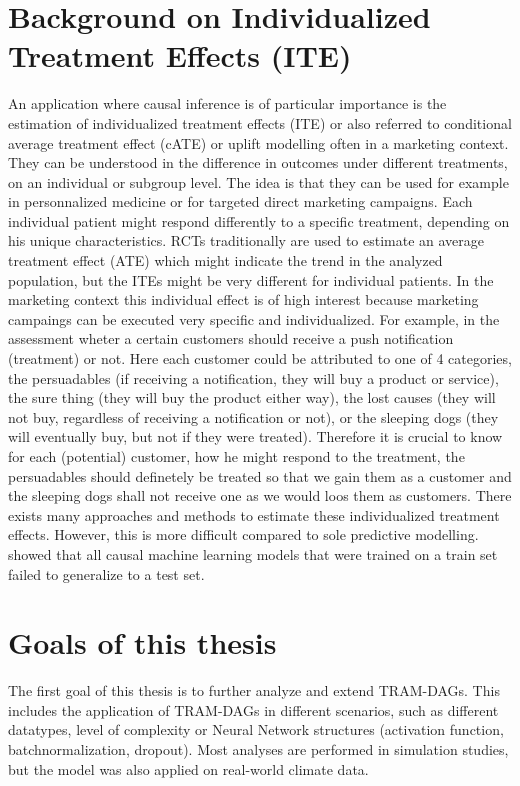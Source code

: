 \section{Background on Individualized Treatment Effects (ITE)}

An application where causal inference is of particular importance is the estimation of individualized treatment effects (ITE) or also referred to conditional average treatment effect (cATE) or uplift modelling often in a marketing context. They can be understood in the difference in outcomes under different treatments, on an individual or subgroup level. The idea is that they can be used for example in personnalized medicine or for targeted direct marketing campaigns. Each individual patient might respond differently to a specific treatment, depending on his unique characteristics. RCTs traditionally are used to estimate an average treatment effect (ATE) which might indicate the trend in the analyzed population, but the ITEs might be very different for individual patients. In the marketing context this individual effect is of high interest because marketing campaings can be executed very specific and individualized. For example, in the assessment wheter a certain customers should receive a push notification (treatment) or not. Here each customer could be attributed to one of 4 categories, the persuadables (if receiving a notification, they will buy a product or service), the sure thing (they will buy the product either way), the lost causes (they will not buy, regardless of receiving a notification or not), or the sleeping dogs (they will eventually buy, but not if they were treated). Therefore it is crucial to know for each (potential) customer, how he might respond to the treatment, the persuadables should definetely be treated so that we gain them as a customer and the sleeping dogs shall not receive one as we would loos them as customers. There exists many approaches and methods to estimate these individualized treatment effects. However, this is more difficult compared to sole predictive modelling. \citet{chen2025} showed that all causal machine learning models that were trained on a train set failed to generalize to a test set. 


\section{Goals of this thesis}

The first goal of this thesis is to further analyze and extend TRAM-DAGs. This includes the application of TRAM-DAGs in different scenarios, such as different datatypes, level of complexity or Neural Network structures (activation function, batchnormalization, dropout). Most analyses are performed in simulation studies, but the model was also applied on real-world climate data.

